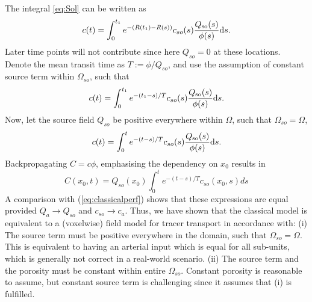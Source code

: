 \documentclass[paper=a4, fontsize=11pt,parskip=half,headings=small]{scrartcl}
\newcommand{\Qso}{Q_{\mathrm{so}}}
\begin{document}
The integral \eqref{eq:Sol} can be written as
\begin{equation}\label{eq:Sol2}
	c(t) = \int_{0}^{t_1} e^{-(R(t_1)-R(s))}c_{so}(s)\frac{\Qso(s)}{\phi(s)} \diff s.
\end{equation}
Later time points will not contribute since here $Q_{so} = 0$ at these locations. 
Denote the mean transit time as $T := \phi/ Q_{so}$, and use the assumption of constant source term within $\Omega_{so}$, such that 
\begin{equation}\label{eq:Sol3}
	c(t) = \int_{0}^{t_1} e^{-(t_1-s)/T}c_{so}(s)\frac{\Qso(s)}{\phi(s)} \diff s.
\end{equation}
Now, let the source field $Q_{so}$ be positive everywhere within $\Omega$, such that $\Omega_{so} = \Omega$, 
\begin{equation}\label{eq:Sol4}
	c(t) = \int_{0}^{t} e^{-(t-s)/T}c_{so}(s)\frac{\Qso(s)}{\phi(s)} \diff s.
\end{equation}
Backpropagating $C = c \phi$, emphasising the dependency on $x_0$ results in
\begin{equation}
C(x_0,t) = Q_{so}(x_0) \int_{0}^t e^{-(t - s)/T}c_{so}(x_0,s) ds
\label{eq:Cpdeclassic}
\end{equation}
A comparison with (\ref{eq:classicalperf}) shows that these expressions are equal provided $Q_a \rightarrow Q_{so}$ and $c_{so} \rightarrow c_{a}$. Thus, we have shown that the classical model is equivalent to a (voxelwise) field model for tracer transport in accordance with: (i) The source term must be positive everywhere in the domain, such that $\Omega_{so} = \Omega$. This is equivalent to having an arterial input which is equal for all sub-units, which is generally not correct in a real-world scenario. (ii) The source term and the porosity must be constant within entire $\Omega_{so}$. Constant porosity is reasonable to assume, but constant source term is challenging since it assumes that (i) is fulfilled.
\end{document}
